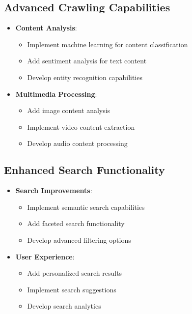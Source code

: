 \documentclass[12pt,a4paper]{report}
\begin{document}
\subsection{Advanced Crawling Capabilities}
\begin{itemize}
\item \textbf{Content Analysis}:
    \begin{itemize}
        \item Implement machine learning for content classification
        \item Add sentiment analysis for text content
        \item Develop entity recognition capabilities
    \end{itemize}
\item \textbf{Multimedia Processing}:
    \begin{itemize}
        \item Add image content analysis
        \item Implement video content extraction
        \item Develop audio content processing
    \end{itemize}
\end{itemize}

\subsection{Enhanced Search Functionality}
\begin{itemize}
\item \textbf{Search Improvements}:
    \begin{itemize}
        \item Implement semantic search capabilities
        \item Add faceted search functionality
        \item Develop advanced filtering options
    \end{itemize}
\item \textbf{User Experience}:
    \begin{itemize}
        \item Add personalized search results
        \item Implement search suggestions
        \item Develop search analytics
    \end{itemize}
\end{itemize}
\end{document}

